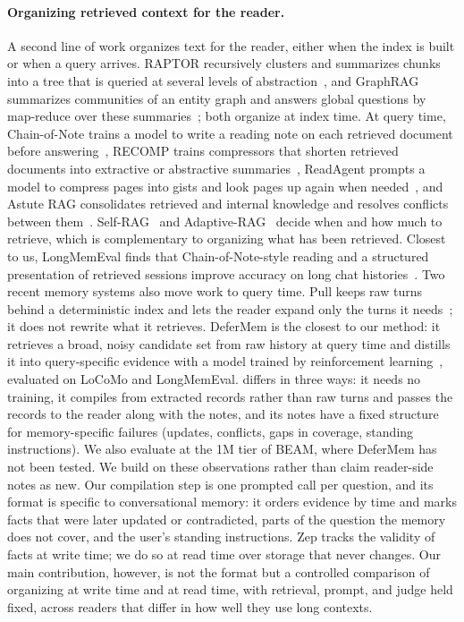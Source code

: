 \paragraph{Organizing retrieved context for the reader.}
A second line of work organizes text for the reader, either when the index is built or when a query arrives.
RAPTOR recursively clusters and summarizes chunks into a tree that is queried at several levels of
abstraction~\citep{sarthi2024raptor}, and GraphRAG summarizes communities of an entity graph and answers global
questions by map-reduce over these summaries~\citep{edge2024graphrag}; both organize at index time. At query time,
Chain-of-Note trains a model to write a reading note on each retrieved document before answering~\citep{yu2023chainofnote},
RECOMP trains compressors that shorten retrieved documents into extractive or abstractive summaries~\citep{xu2024recomp},
ReadAgent prompts a model to compress pages into gists and look pages up again when needed~\citep{lee2024readagent}, and
Astute RAG consolidates retrieved and internal knowledge and resolves conflicts between them~\citep{wang2024astute}.
Self-RAG~\citep{asai2024selfrag} and Adaptive-RAG~\citep{jeong2024adaptive} decide when and how much to retrieve, which
is complementary to organizing what has been retrieved. Closest to us, LongMemEval finds that Chain-of-Note-style reading
and a structured presentation of retrieved sessions improve accuracy on long chat histories~\citep{wu2025longmemeval}.
Two recent memory systems also move work to query time. Pull keeps raw turns behind a deterministic index and lets the
reader expand only the turns it needs~\citep{chen2026pull}; it does not rewrite what it retrieves. DeferMem is the
closest to our method: it retrieves a broad, noisy candidate set from raw history at query time and distills it into
query-specific evidence with a model trained by reinforcement learning~\citep{yin2026defermem}, evaluated on LoCoMo
and LongMemEval. \method{} differs in three ways: it needs no training, it compiles from extracted records rather
than raw turns and passes the records to the reader along with the notes, and its notes have a fixed structure for
memory-specific failures (updates, conflicts, gaps in coverage, standing instructions). We also evaluate at the 1M
tier of BEAM, where DeferMem has not been tested.
We build on these observations rather than claim reader-side notes as new. Our compilation step is one prompted call per
question, and its format is specific to conversational memory: it orders evidence by time and marks facts that were
later updated or contradicted, parts of the question the memory does not cover, and the user's standing instructions.
Zep tracks the validity of facts at write time; we do so at read time over storage that never changes. Our main
contribution, however, is not the format but a controlled comparison of organizing at write time and at read time,
with retrieval, prompt, and judge held fixed, across readers that differ in how well they use long contexts.


